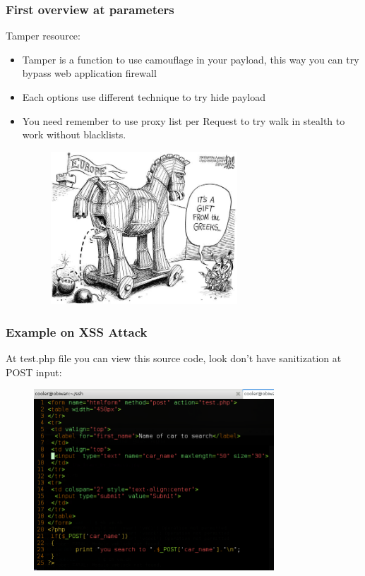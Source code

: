 \documentclass[serif,mathserif]{beamer}
\begin{document}
\begin{frame}
  \frametitle{First overview at parameters}
  Tamper resource:
  \begin{itemize}
  \item Tamper is a function to use camouflage in your payload, this way you can try bypass web application firewall
  \item Each options use different technique to try hide payload 
  \item You need remember to use proxy list per Request to try walk in stealth to work without blacklists.  
  \begin{figure}[t]
    \centering
    \includegraphics[width=7cm]{images/gift2.jpg}
  \end{figure}
 \end{itemize}
\end{frame}


\begin{frame}
  \frametitle{Example on XSS Attack}
  At test.php file you can view this source code, look don't have sanitization at POST input:
  \begin{itemize}
  \begin{figure}[t]
    \centering
    \includegraphics[width=9cm]{images/code_test_php.png}
  \end{figure}
 \end{itemize}
\end{frame}
\end{document}
